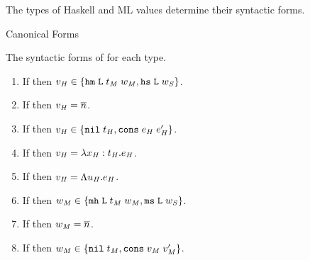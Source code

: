 The types of Haskell and ML values determine their syntactic forms.

\begin{lemma}{Canonical Forms}

\label{lemcan}

The syntactic forms of \prouvs for each type.

\begin{enumerate}



\item If \judeh{\env}{\varvaluh}{\tylump} then $v_{\mathit{H}} \in \lbrace \mathtt{hm} \; \mathtt{L} \; t_{\mathit{M}} \; w_{\mathit{M}}, \mathtt{hs} \; \mathtt{L} \; w_{\mathit{S}} \rbrace$.


\item If \judeh{\env}{\varvaluh}{\tynum} then $v_{\mathit{H}} = \overline{n}$.


\item If \judeh{\env}{\varvaluh}{\tylist{\vartyh}} then $v_{\mathit{H}} \in \lbrace \mathtt{nil} \; t_{\mathit{H}}, \mathtt{cons} \; e_{\mathit{H}} \; e_{\mathit{H}}' \rbrace$.


\item If \judeh{\env}{\varvaluh}{\tyfun{\first{\vartyh}}{\second{\vartyh}}} then $v_{\mathit{H}} = \lambda x_{\mathit{H}} : t_{\mathit{H}} . e_{\mathit{H}}$.


\item If \judeh{\env}{\varvaluh}{\tyfor{\tyvarh}{\vartyh}} then $v_{\mathit{H}} = \Lambda u_{\mathit{H}} . e_{\mathit{H}}$.



\item If \judem{\env}{\varvalfm}{\tylump} then $w_{\mathit{M}} \in \lbrace \mathtt{mh} \; \mathtt{L} \; t_{\mathit{M}} \; w_{\mathit{M}}, \mathtt{ms} \; \mathtt{L} \; w_{\mathit{S}} \rbrace$.


\item If \judem{\env}{\varvalfm}{\tynum} then $w_{\mathit{M}} = \overline{n}$.


\item If \judem{\env}{\varvalfm}{\tylist{\vartym}} then $w_{\mathit{M}} \in \lbrace \mathtt{nil} \; t_{\mathit{M}}, \mathtt{cons} \; v_{\mathit{M}} \; v_{\mathit{M}}' \rbrace$.



\end{enumerate}
\end{lemma}
